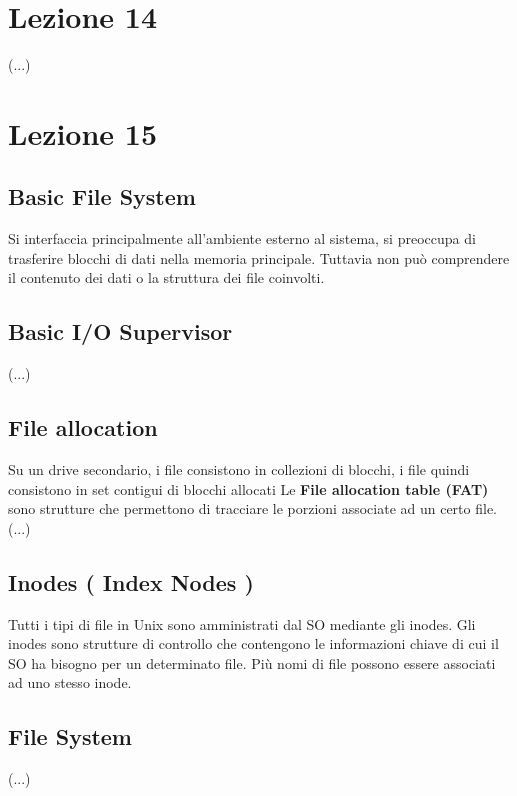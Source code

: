 \documentclass[12pt, a4paper]{article}
\begin{document}
	
	
	\section*{Lezione 14}
	(...)
	
	
	
	\section*{Lezione 15}
	
	
	\subsection*{Basic File System}
	Si interfaccia principalmente all'ambiente esterno al sistema, si preoccupa di trasferire blocchi di dati nella memoria principale. Tuttavia non può comprendere il contenuto dei dati o la struttura dei file coinvolti.
	
	\subsection*{Basic I/O Supervisor}
	(...)
	
	\subsection*{File allocation}
	Su un drive secondario, i file consistono in collezioni di blocchi, i file quindi consistono in set contigui di blocchi allocati Le \textbf{File allocation table (FAT)} sono strutture che permettono di tracciare le porzioni associate ad un certo file. \\
	(...) \\
	
	\subsection*{Inodes ( Index Nodes )}
	Tutti i tipi di file in Unix sono amministrati dal SO mediante gli inodes. Gli inodes sono strutture di controllo che contengono le informazioni chiave di cui il SO ha bisogno per un determinato file. Più nomi di file possono essere associati ad uno stesso inode. 
	
	\subsection*{File System}
	(...)
	
	
	
	
\end{document}
